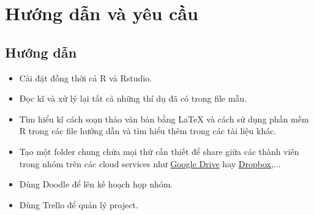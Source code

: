 \documentclass[a4paper]{article}
\theoremstyle{definition}
\newtheorem{exer}{Bài toán}
\begin{document}






\section{Hướng dẫn và yêu cầu}\label{hd_va_yc}
\subsection{Hướng dẫn} 
\begin{itemize}
\item Cài đặt đồng thời cả R và Rstudio.

\item Đọc kĩ và xử lý lại tất cả những thí dụ đã có trong file mẫu.

\item Tìm hiểu kĩ cách soạn thảo văn bản bằng LaTeX và cách sử dụng phần mềm R trong các file hướng dẫn và tìm hiểu thêm trong các tài liệu khác.

\item Tạo một folder chung chứa mọi thứ cần thiết để share giữa các thành viên trong nhóm trên các cloud services như \href{https://drive.google.com}{Google Drive} hay \href{http://tiny.cc/ref_dropbox}{Dropbox},...

\item Dùng Doodle để lên kế hoạch họp nhóm.

\item Dùng Trello để quản lý project.

\end{itemize}
\end{document}
